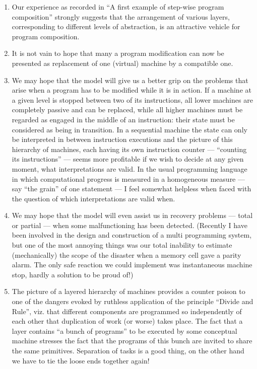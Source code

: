 \begin{enumerate}[label=(\arabic*)]
	\item Our experience as recorded in ``A first example of step-wise program composition'' strongly suggests that the arrangement of various layers, corresponding to different levels of abstraction, is an attractive vehicle for program composition.

	\item It is not vain to hope that many a program modification can now be presented as replacement of one (virtual) machine by a compatible one.

	\item We may hope that the model will give us a better grip on the problems that arise when a program has to be modified while it is in action. If a machine at a given level is stopped between two of its instructions, all lower  machines are completely passive and can be replaced, while all higher machines must be regarded as engaged in the middle of an instruction: their state must be considered as being in transition. In a sequential machine the state can only be interpreted in between instruction executions and the picture of this hierarchy of machines, each having its own instruction counter --- ``counting its instructions'' --- seems more profitable if we wish to decide at any given moment, what interpretations are valid. In the usual programming language in which computational progress is measured in a homogeneous measure --- say ``the grain'' of one statement --- I feel somewhat helpless when faced with the question of which interpretations are valid when.
	
	\item We may hope that the model will even assist us in recovery problems 	--- total or partial --- when some malfunctioning has been detected. (Recently I have been involved in the design and construction of a multi programming system, but one of the most annoying things was our total inability to estimate (mechanically) the scope of the disaster when a memory cell gave a parity alarm. The only safe reaction we could implement was instantaneous machine stop, hardly a solution to be proud of!)
	
	\item The picture of a layered hierarchy of machines provides a counter 	poison to one of the dangers evoked by ruthless application of the principle ``Divide and Rule'', viz. that different components are programmed so independently of each other that duplication of work (or worse) takes place. The fact that a layer contains ``a bunch of programs'' to be executed by some conceptual machine stresses the fact that the programs of this bunch are invited to share the same primitives. Separation of tasks is a good thing, on the other hand we have to tie the loose ends together again!
\end{enumerate}

